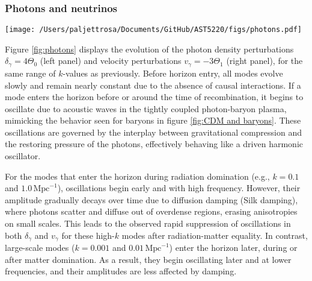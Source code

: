 \documentclass{aa}
\numberwithin{equation}{section}
\numberwithin{table}{section}
\numberwithin{figure}{section}
\begin{document}
\subsubsection{Photons and neutrinos}

\begin{figure*}
  \centering
  \texttt{[image: /Users/paljettrosa/Documents/GitHub/AST5220/figs/photons.pdf]}
  \caption{Evolution of photon density $\delta_\gamma=4\Theta_0$ (left) and velocity $v_\gamma=-3\Theta_1$ (right) perturbations. 
  The photon perturbations grow and oscillate after horizon entry, with oscillations damping over time, especially for small-scale modes after matter-radiation equality.}\label{fig:photons}
\end{figure*}

Figure \ref{fig:photons} displays the evolution of the photon density perturbations $\delta_\gamma = 4\Theta_0$ (left panel) and velocity perturbations $v_\gamma = -3\Theta_1$ (right panel), for the same range of $k$-values as previously. Before horizon entry, all modes evolve slowly and remain nearly constant due to the absence of causal interactions. If a mode enters the horizon before or around the time of recombination, it begins to oscillate due to acoustic waves in the tightly coupled photon-baryon plasma, mimicking the behavior seen for baryons in figure \ref{fig:CDM and baryons}. These oscillations are governed by the interplay between gravitational compression and the restoring pressure of the photons, effectively behaving like a driven harmonic oscillator.

For the modes that enter the horizon during radiation domination (e.g., $k=0.1$ and $1.0\,\text{Mpc}^{-1}$), oscillations begin early and with high frequency. However, their amplitude gradually decays over time due to diffusion damping (Silk damping), where photons scatter and diffuse out of overdense regions, erasing anisotropies on small scales. This leads to the observed rapid suppression of oscillations in both $\delta_\gamma$ and $v_\gamma$ for these high-$k$ modes after radiation-matter equality. In contrast, large-scale modes ($k=0.001$ and $0.01\,\text{Mpc}^{-1}$) enter the horizon later, during or after matter domination. As a result, they begin oscillating later and at lower frequencies, and their amplitudes are less affected by damping. 
\end{document}
